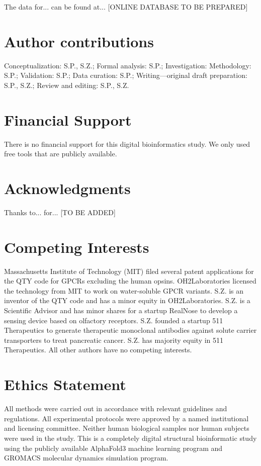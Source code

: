 \documentclass[fleqn,10pt,lineno]{manuscript}
\begin{document}
The data for... can be found at... [ONLINE DATABASE TO BE PREPARED]

\section*{Author contributions}

Conceptualization: S.P., S.Z.; Formal analysis: S.P.; Investigation: Methodology: S.P.; Validation: S.P.; Data curation: S.P.; Writing—original draft preparation: S.P., S.Z.; Review and editing: S.P., S.Z. 

\section*{Financial Support}

There is no financial support for this digital bioinformatics study. We only used free tools that are publicly available. 

\section*{Acknowledgments}

Thanks to... for... [TO BE ADDED]


\section*{Competing Interests}

Massachusetts Institute of Technology (MIT) filed several patent applications for the QTY code for GPCRs excluding the human opsins. OH2Laboratories licensed the technology from MIT to work on water-soluble GPCR variants. S.Z. is an inventor of the QTY code and has a minor equity in OH2Laboratories. S.Z. is a Scientific Advisor and has minor shares for a startup RealNose to develop a sensing device based on olfactory receptors. S.Z. founded a startup 511 Therapeutics to generate therapeutic monoclonal antibodies against solute carrier transporters to treat pancreatic cancer. S.Z. has majority equity in 511 Therapeutics. All other authors have no competing interests.


\section*{Ethics Statement}

All methods were carried out in accordance with relevant guidelines and regulations. All experimental protocols were approved by a named institutional and licensing committee. Neither human biological samples nor human subjects were used in the study. This is a completely digital structural bioinformatic study using the publicly available AlphaFold3 machine learning program and GROMACS molecular dynamics simulation program.
\end{document}

